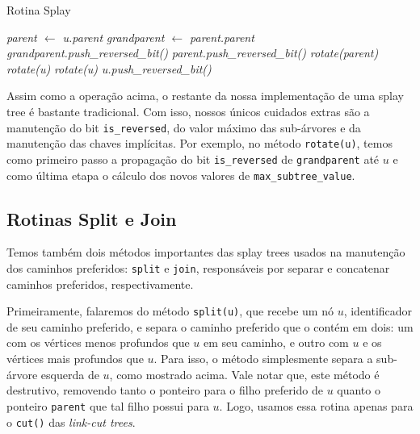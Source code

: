 \begin{algorithm}[h!]
    \caption{Rotina Splay}\label{splay:splay}
    \begin{algorithmic}[1]
         
        \State \emph{parent $\gets$ u.parent}
        \State \emph{grandparent $\gets$ parent.parent}
        \State \emph{grandparent.push\_reversed\_bit()}
        \State \emph{parent.push\_reversed\_bit()}
        \State \emph{rotate(parent)} 
        \Else
        \State \emph{rotate(u)} 
        \EndIf
        \EndIf
        \State \emph{rotate(u)}
        \EndWhile
        \State \emph{u.push\_reversed\_bit()}
        \EndFunction
    \end{algorithmic}
\end{algorithm}

Assim como a operação acima, o restante da nossa implementação de uma splay tree é bastante tradicional. Com isso, nossos únicos cuidados extras são a manutenção do bit \texttt{is\_reversed}, do valor máximo das sub-árvores e da manutenção das chaves implícitas. Por exemplo, no método \texttt{rotate(u)}, temos como primeiro passo a propagação do bit \texttt{is\_reversed} de \texttt{grandparent} até $u$ e como última etapa o cálculo dos novos valores de \texttt{max\_subtree\_value}.

\subsection{Rotinas Split e Join}
\label{subsection:lct-splay-split-join}

Temos também dois métodos importantes das splay trees usados na manutenção dos caminhos preferidos: \texttt{split} e \texttt{join}, responsáveis por separar e concatenar caminhos preferidos, respectivamente.

Primeiramente, falaremos do método \texttt{split(u)}, que recebe um nó $u$, identificador de seu caminho preferido, e separa o caminho preferido que o contém em dois: um com os vértices menos profundos que $u$ em seu caminho, e outro com $u$ e os vértices mais profundos que $u$. Para isso, o método simplesmente separa a sub-árvore esquerda de $u$, como mostrado acima. Vale notar que, este método é destrutivo, removendo tanto o ponteiro para o filho preferido de $u$ quanto o ponteiro \texttt{parent} que tal filho possui para $u$. Logo, usamos essa rotina apenas para o \texttt{cut()} das \emph{link-cut trees}.

